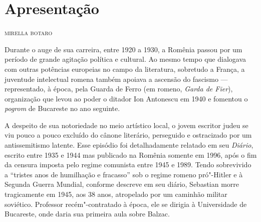 \pagestyle{posf}  

\chapter*{Apresentação\smallskip{}}

\begin{flushright}
\textsc{mirella botaro}
\end{flushright}

\noindent{}

Durante o auge de sua carreira, entre 1920 a 1930, a Romênia passou por um período de grande agitação política e cultural. Ao mesmo tempo que dialogava com outras potências europeias no campo da literatura, sobretudo a França, a juventude intelectual romena também apoiava a ascensão do fascismo --- representado, à época, pela Guarda de Ferro (em romeno, \textit{Garda de Fier}), organização que levou ao poder o ditador Ion Antonescu em 1940 e fomentou o \textit{pogrom} de Bucareste no ano seguinte.

A despeito de sua notoriedade no meio artístico local, o jovem escritor judeu 
se viu pouco a pouco excluído do cânone literário,
perseguido e ostracizado por um antissemitismo latente. Esse episódio foi detalhadamente relatado em seu
\emph{Diário}, escrito entre 1935 e 1944 mas publicado na Romênia somente em 1996, após o fim da censura
imposta pelo regime comunista entre 1945 e 1989. Tendo sobrevivido a
``tristes anos de humilhação e fracasso'' sob o regime romeno pró"-Hitler
e à Segunda Guerra Mundial, conforme descreve em seu diário, Sebastian 
morre tragicamente em 1945, aos 38 anos, atropelado por um caminhão
militar soviético. Professor recém"-contratado à época, ele se dirigia à
Universidade de Bucareste, onde daria sua primeira aula sobre Balzac.

